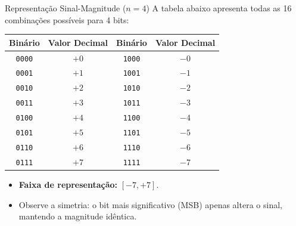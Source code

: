 \begin{frame}{Representação Sinal-Magnitude ($n=4$)}
    A tabela abaixo apresenta todas as 16 combinações possíveis para 4 bits:

    \begin{center}
        \small
        \begin{tabular}{|c|c||c|c|}
            \hline
            \textbf{Binário} & \textbf{Valor Decimal} & \textbf{Binário} & \textbf{Valor Decimal} \\ \hline \hline
            \texttt{0000}    & $+0$                   & \texttt{1000}    & $-0$                   \\ \hline
            \texttt{0001}    & $+1$                   & \texttt{1001}    & $-1$                   \\ \hline
            \texttt{0010}    & $+2$                   & \texttt{1010}    & $-2$                   \\ \hline
            \texttt{0011}    & $+3$                   & \texttt{1011}    & $-3$                   \\ \hline
            \texttt{0100}    & $+4$                   & \texttt{1100}    & $-4$                   \\ \hline
            \texttt{0101}    & $+5$                   & \texttt{1101}    & $-5$                   \\ \hline
            \texttt{0110}    & $+6$                   & \texttt{1110}    & $-6$                   \\ \hline
            \texttt{0111}    & $+7$                   & \texttt{1111}    & $-7$                   \\ \hline
        \end{tabular}
    \end{center}

    \begin{itemize}
        \item \textbf{Faixa de representação:} $[-7, +7]$.
        \item Observe a simetria: o bit mais significativo (MSB) apenas altera o sinal, mantendo a magnitude idêntica.
    \end{itemize}
\end{frame}

